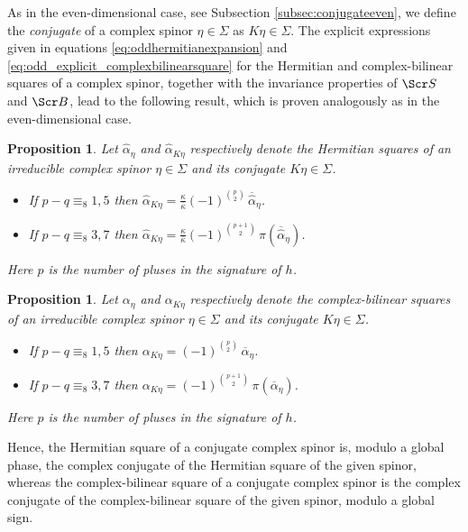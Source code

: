 \documentclass[10pt,a4paper,twoside,reqno]{amsart}
\theoremstyle{plain}
\newtheorem{prop}[thm]{Proposition}
\theoremstyle{definition}
\theoremstyle{remark}
\def\scB{\Scr B}
\def\scS{\Scr S}
\begin{document}
As in the even-dimensional case, see Subsection \ref{subsec:conjugateeven}, we define the \emph{conjugate} of a complex spinor $\eta\in\Sigma$ as $K\eta\in\Sigma$. The explicit expressions given in equations \eqref{eq:oddhermitianexpansion} and \eqref{eq:odd_explicit_complexbilinearsquare} for the Hermitian and complex-bilinear squares of a complex spinor, together with the invariance properties of $\scS$ and $\scB$, lead to the following result, which is proven analogously as in the even-dimensional case.

\begin{prop}
\label{prop:Hermitiansquareconjugate_odd}
Let $\widehat{\alpha}_{\eta}$ and $\widehat{\alpha}_{K\eta}$ respectively denote the Hermitian squares of an irreducible complex spinor $\eta\in \Sigma$ and its conjugate $K\eta \in \Sigma$. 
\begin{itemize}
\item If $p-q \equiv_8 1, 5$ then $\widehat{\alpha}_{K\eta} = \tfrac{\kappa}{\bar\kappa}(-1)^{\binom{p}{2}} \, \overline{\widehat{\alpha}}_{\eta}$.
 
\item If $p-q \equiv_8 3, 7$ then $\widehat{\alpha}_{K\eta} = \tfrac{\kappa}{\bar\kappa}(-1)^{\binom{p + 1}{2}} \, \pi(\overline{\widehat{\alpha}}_{\eta})$.
\end{itemize}

\noindent
Here $p$ is the number of pluses in the signature of $h$.
\end{prop}

\begin{prop}
\label{prop:Bilinearsquareconjugate_odd}
Let $\alpha_{\eta}$ and $\alpha_{K\eta}$ respectively denote the complex-bilinear squares of an irreducible complex spinor $\eta\in \Sigma$ and its conjugate $K\eta \in \Sigma$.  
\begin{itemize}
\item If $p-q \equiv_8 1, 5$ then $\alpha_{K\eta} = (-1)^{\binom{p}{2}} \,\overline{\alpha}_{\eta}$.
 
\item If $p-q \equiv_8 3, 7$ then $\alpha_{K\eta} = (-1)^{\binom{p + 1}{2}} \, \pi(\overline{\alpha}_{\eta})$.
\end{itemize}

\noindent
Here $p$ is the number of pluses in the signature of $h$.
\end{prop} 

\noindent
Hence, the Hermitian square of a conjugate complex spinor is, modulo a global phase, the complex conjugate of the Hermitian square of the given spinor, whereas the complex-bilinear square of a conjugate complex spinor is the complex conjugate of the complex-bilinear square of the given spinor, modulo a global sign.
\end{document}
